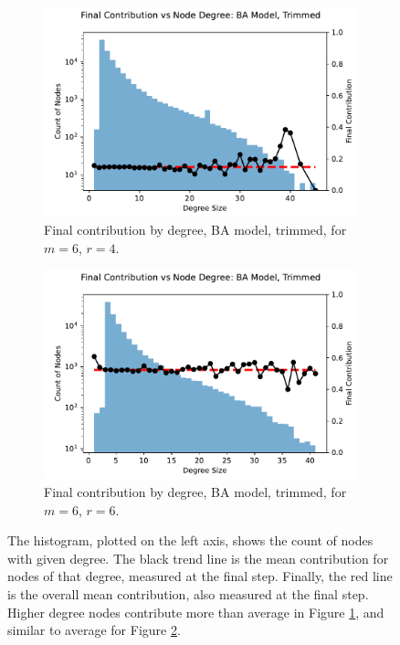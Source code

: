 \FloatBarrier 
\begin{figure}[!h]
  \begin{subfigure}[b]{0.45\textwidth}
    \includegraphics[width=1.1\textwidth]{images/ID_BA_node_groups_m_6_phi_4_trimmed.pdf}
    \caption{Final contribution by degree, BA model, trimmed, for $m=6$, $r=4$.   }
    \label{ID_by_degree_m_6_phi_4}
  \end{subfigure}
  \hfill
  \begin{subfigure}[b]{0.45\textwidth}
    \includegraphics[width=1.1\textwidth]{images/ID_BA_node_groups_m_6_phi_6_trimmed.pdf}
    \caption{Final contribution by degree, BA model, trimmed, for $m=6$, $r=6$. }
    \label{ID_by_degree_m_6_phi_6}
  \end{subfigure}
  \caption{The histogram, plotted on the left axis, shows the count of nodes with given degree. The black trend line is the mean contribution for nodes of that degree, measured at the final step. Finally, the red line is the overall mean contribution, also measured at the final step. Higher degree nodes contribute more than average in Figure \ref{ID_by_degree_m_6_phi_4}, and similar to average for Figure \ref{ID_by_degree_m_6_phi_6}. } \label{ID_by_degree_m_6}
\end{figure} 
\FloatBarrier


